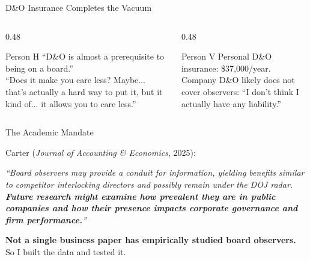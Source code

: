 \documentclass[aspectratio=169,12pt]{beamer}
\begin{document}
\begin{frame}{D\&O Insurance Completes the Vacuum}
\begin{columns}
\begin{column}{0.48\textwidth}
\begin{block}{Person H}
\small
``D\&O is almost a prerequisite to being on a board.''\\[6pt]
``Does it make you care less? Maybe... that's actually a hard way to put it, but it kind of... it allows you to care less.''
\end{block}
\end{column}
\begin{column}{0.48\textwidth}
\begin{block}{Person V}
\small
Personal D\&O insurance: \$37,000/year.\\[6pt]
Company D\&O likely does not cover observers: ``I don't think I actually have any liability.''
\end{block}
\end{column}
\end{columns}
\vspace{0.8em}
\begin{center}
\end{center}
\end{frame}

\begin{frame}{The Academic Mandate}
\begin{center}
\large
Carter (\textit{Journal of Accounting \& Economics}, 2025):
\end{center}
\vspace{0.5em}
\begin{block}{}
\centering
\textit{``Board observers may provide a conduit for information, yielding benefits similar to competitor interlocking directors and possibly remain under the DOJ radar.}\\[6pt]
\textit{\textbf{Future research might examine how prevalent they are in public companies and how their presence impacts corporate governance and firm performance.}''}
\end{block}
\vspace{1em}
\begin{center}
\Large\textbf{Not a single business paper has empirically studied board observers.}\\[8pt]
\large\textcolor{harvardcrimson}{So I built the data and tested it.}
\end{center}
\end{frame}
\end{document}
